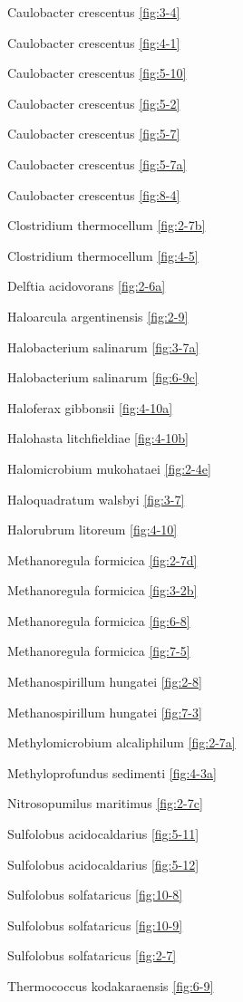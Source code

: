\documentclass[]{tufte-book}
\begin{document}
Caulobacter crescentus \ref{fig:3-4}

Caulobacter crescentus \ref{fig:4-1}

Caulobacter crescentus \ref{fig:5-10}

Caulobacter crescentus \ref{fig:5-2}

Caulobacter crescentus \ref{fig:5-7}

Caulobacter crescentus \ref{fig:5-7a}

Caulobacter crescentus \ref{fig:8-4}

Clostridium thermocellum \ref{fig:2-7b}

Clostridium thermocellum \ref{fig:4-5}

Delftia acidovorans \ref{fig:2-6a}

Haloarcula argentinensis \ref{fig:2-9}

Halobacterium salinarum \ref{fig:3-7a}

Halobacterium salinarum \ref{fig:6-9c}

Haloferax gibbonsii \ref{fig:4-10a}

Halohasta litchfieldiae \ref{fig:4-10b}

Halomicrobium mukohataei \ref{fig:2-4e}

Haloquadratum walsbyi \ref{fig:3-7}

Halorubrum litoreum \ref{fig:4-10}

Methanoregula formicica \ref{fig:2-7d}

Methanoregula formicica \ref{fig:3-2b}

Methanoregula formicica \ref{fig:6-8}

Methanoregula formicica \ref{fig:7-5}

Methanospirillum hungatei \ref{fig:2-8}

Methanospirillum hungatei \ref{fig:7-3}

Methylomicrobium alcaliphilum \ref{fig:2-7a}

Methyloprofundus sedimenti \ref{fig:4-3a}

Nitrosopumilus maritimus \ref{fig:2-7c}

Sulfolobus acidocaldarius \ref{fig:5-11}

Sulfolobus acidocaldarius \ref{fig:5-12}

Sulfolobus solfataricus \ref{fig:10-8}

Sulfolobus solfataricus \ref{fig:10-9}

Sulfolobus solfataricus \ref{fig:2-7}

Thermococcus kodakaraensis \ref{fig:6-9}
\end{document}
